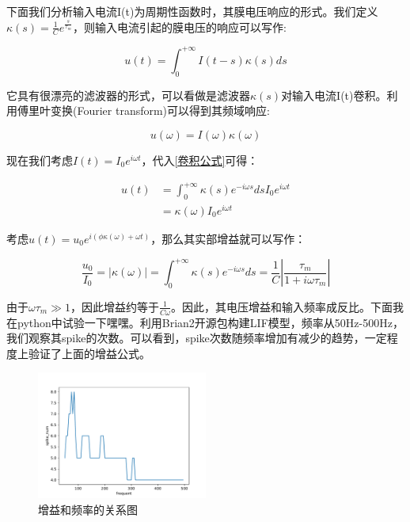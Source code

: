 \documentclass[12pt, a4paper, oneside]{ctexbook}
\begin{document}
下面我们分析输入电流I(t)为周期性函数时，其膜电压响应的形式。我们定义$\kappa (s)=\frac{1}{C}e^{\frac{s}{\tau_m}}$，则输入电流引起的膜电压的响应可以写作:

\begin{equation}
    u(t)=\int_0^{+\infty}I(t-s)\kappa (s)ds
    \label{卷积公式}
\end{equation}

它具有很漂亮的滤波器的形式，可以看做是滤波器$\kappa(s)$对输入电流I(t)卷积。利用傅里叶变换(Fourier transform)可以得到其频域响应:

\begin{equation}
    u(\omega )=I(\omega )\kappa (\omega )
\end{equation}

现在我们考虑$I(t)=I_0e^{i\omega t}$，代入\ref*{卷积公式}可得：

\begin{equation}
    \begin{aligned}
        u(t)&=\int_0^{+\infty}\kappa (s)e^{-i\omega s}dsI_0e^{i\omega t}\\
        &=\kappa (\omega)I_0e^{i\omega t}
    \end{aligned}
\end{equation}

考虑$u(t)=u_0e^{i(\phi \kappa(\omega)+\omega t)}$，那么其实部增益就可以写作：

\begin{equation}
    \frac{u_0}{I_0}=|\kappa (\omega)|=\int_0^{+\infty}\kappa (s)e^{-i\omega s}ds=\frac{1}{C}|\frac{\tau_m}{1+i\omega \tau_m}|
\end{equation}

由于$\omega \tau_m\gg 1$，因此增益约等于$\frac{1}{C\omega}$。因此，其电压增益和输入频率成反比。下面我在python中试验一下嘿嘿。利用Brian2开源包构建LIF模型，频率从50Hz-500Hz，我们观察其spike的次数。可以看到，spike次数随频率增加有减少的趋势，一定程度上验证了上面的增益公式。

\begin{figure}[H]
    \centering
    \includegraphics[width=0.5\textwidth]{增益和频率的关系.pdf}
    \caption{增益和频率的关系图}
\end{figure} 
\end{document}
